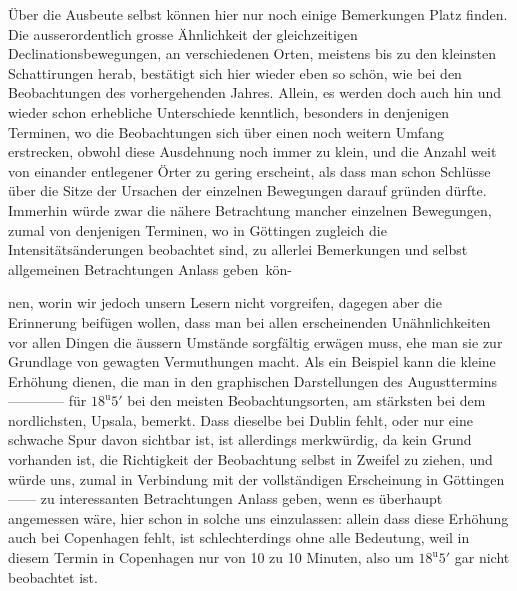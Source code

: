 Über die Ausbeute selbst können hier nur noch einige Bemerkungen Platz finden. Die ausserordentlich grosse Ähnlichkeit der gleichzeitigen Declinationsbewegungen, an verschiedenen Orten, meistens bis zu den kleinsten Schattirungen herab, bestätigt sich hier wieder eben so schön, wie bei den Beobachtungen des vorhergehenden Jahres. Allein, es werden doch auch hin und wieder schon erhebliche Unterschiede kenntlich, besonders in denjenigen Terminen, wo die Beobachtungen sich über einen noch weitern Umfang erstrecken, obwohl diese Ausdehnung noch immer zu klein, und die Anzahl weit von einander entlegener Örter zu gering erscheint, als dass man schon Schlüsse über die Sitze der Ursachen der einzelnen Bewegungen darauf gründen dürfte. Immerhin würde zwar die nähere Betrachtung mancher einzelnen Bewegungen, zumal von denjenigen Terminen, wo in Göttingen zugleich die Intensitätsänderungen beobachtet sind, zu allerlei Bemerkungen und selbst allgemeinen Betrachtungen Anlass geben~kön-\par
\clearpage
{}
\noindent nen, worin wir jedoch unsern Lesern nicht vorgreifen, dagegen aber die Erinnerung beifügen wollen, dass man bei allen erscheinenden Unähnlichkeiten vor allen Dingen die äussern Umstände sorgfältig erwägen muss, ehe man sie zur Grundlage von gewagten Vermuthungen macht. Als ein Beispiel kann die kleine Erhöhung dienen, die man in den graphischen Darstellungen des Augusttermins ---\quad---\quad---\quad--- für $18^{\mathrm u}5'$ bei den meisten Beobachtungsorten, am stärksten bei dem nordlichsten, Upsala, bemerkt. Dass dieselbe bei Dublin fehlt, oder nur eine schwache Spur davon sichtbar ist, ist allerdings merkwürdig, da kein Grund vorhanden ist, die Richtigkeit der Beobachtung selbst in Zweifel zu ziehen, und würde uns, zumal in Verbindung mit der vollständigen Erscheinung in Göttingen ---\quad--- zu interessanten Betrachtungen Anlass geben, wenn es überhaupt angemessen wäre, hier schon in solche uns einzulassen: allein dass diese Erhöhung auch bei Copenhagen fehlt, ist schlechterdings ohne alle Bedeutung, weil in diesem Termin in Copenhagen nur von 10 zu 10 Minuten, also um $18^{\mathrm u}5'$ gar nicht beobachtet ist.

